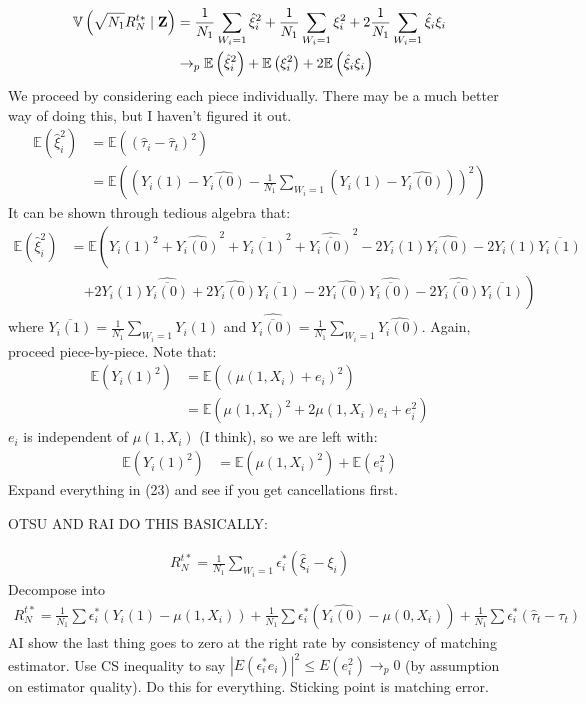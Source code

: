 \documentclass[10pt,letterpaper]{article}
\begin{document}
\begin{align}
\mathbb{V}\left( \sqrt{N_1} R_N^{t*} \mid \bold{Z} \right) &= \frac{1}{N_1} \sum_{W_i = 1} \hat{\xi}_i^2  +  \frac{1}{N_1} \sum_{W_i = 1} \xi_i^2  + 2 \frac{1}{N_1} \sum_{W_i = 1} \hat{\xi}_i \xi_i \\
&\rightarrow_p \mathbb{E}\left(\hat{\xi}_i^2 \right) + \mathbb{E}\left(\xi_i^2\right) + 2 \mathbb{E}\left( \hat{\xi}_i \xi_i \right) 
\end{align}
We proceed by considering each piece individually. There may be a much better way of doing this, but I haven't figured it out.
\begin{align}
\mathbb{E}\left( \hat{\xi}_i^2 \right) &= \mathbb{E}\left( \left(\hat{\tau}_i - \hat{\tau}_t \right)^2\right) \nonumber \\
&= \mathbb{E}\left(\left( Y_i(1) - \widehat{Y_i(0)} - \frac{1}{N_1} \sum_{W_i=1} \left(Y_i(1) - \widehat{Y_i(0)} \right) \right)^2\right)
\end{align}
It can be shown through tedious algebra that:
\begin{align}
\mathbb{E}\left( \hat{\xi}_i^2 \right) &= \mathbb{E}\left( Y_i(1)^2 + \widehat{Y_i(0)}^2 + \overline{Y_i(1)}^2 + \widehat{\overline{Y_i(0)}}^2 - 2 Y_i(1) \widehat{Y_i(0)} - 2 Y_i(1) \overline{Y_i(1)} \right. \nonumber \\
&\quad \left. + 2Y_i(1) \widehat{\overline{Y_i(0)}} + 2 \widehat{Y_i(0)} \overline{Y_i(1)} - 2\widehat{Y_i(0)} \widehat{\overline{Y_i(0)}} - 2 \widehat{\overline{Y_i(0)}} \overline{Y_i(1)} \right)
\end{align}
where $\overline{Y_i(1)} = \frac{1}{N_1} \sum_{W_i=1} Y_i(1)$ and $\widehat{\overline{Y_i(0)}} = \frac{1}{N_1} \sum_{W_i = 1} \widehat{Y_i(0)}$. Again, proceed piece-by-piece. Note that:
\begin{align}
\mathbb{E}\left(Y_i(1)^2 \right) &= \mathbb{E}\left(\left(\mu(1,X_i) + e_i\right)^2\right) \nonumber \\
&= \mathbb{E}\left( \mu(1,X_i)^2 + 2 \mu(1,X_i)e_i + e_i^2 \right)
\end{align}
$e_i$ is independent of $\mu(1,X_i)$ (I think), so we are left with:
\begin{align}
\mathbb{E}\left( Y_i(1)^2 \right) &= \mathbb{E}\left( \mu(1,X_i)^2 \right) + \mathbb{E}\left(e_i^2\right)
\end{align}
Expand everything in (23) and see if you get cancellations first.

OTSU AND RAI DO THIS BASICALLY:

\begin{align}
R^{t*}_N = \frac{1}{N_1} \sum_{W_i = 1} \epsilon_i^* \left( \hat{\xi}_i - \xi_i \right)
\end{align}
Decompose into
\begin{align}
R^{t*}_N = \frac{1}{N_1} \sum \epsilon_i^* \left( Y_i(1) - \mu(1,X_i) \right) + \frac{1}{N_1} \sum \epsilon_i^* \left( \widehat{Y_i(0)} - \mu(0,X_i)\right) + \frac{1}{N_1} \sum \epsilon_i^* \left(\hat{\tau}_t - \tau_t \right)
\end{align}
AI show the last thing goes to zero at the right rate by consistency of matching estimator. Use CS inequality to say $|E(\epsilon_i^* e_i)|^2 \leq E(e_i^2) \rightarrow_p 0$ (by assumption on estimator quality). Do this for everything. Sticking point is matching error.
\end{document}
